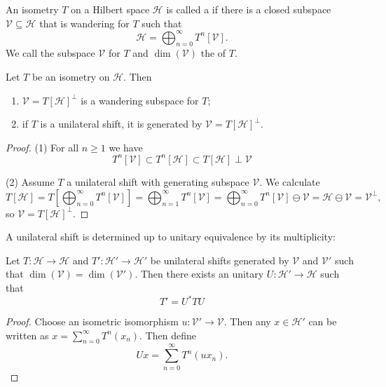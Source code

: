 \begin{definition}
An isometry $T$ on a Hilbert space $\mathcal{H}$ is called a  if there is a closed subspace $\mathcal{V}\subseteq \mathcal{H}$ that is wandering for $T$ such that
\[ \mathcal{H} = \bigoplus_{n=0}^\infty T^n[\mathcal{V}]. \]
We call the subspace $\mathcal{V}$  for $T$ and $\dim(\mathcal{V})$ the  of $T$.
\end{definition}
\begin{lemma} \label{lemma:WoldLemma}
Let $T$ be an isometry on $\mathcal{H}$. Then
\begin{enumerate}
\item $\mathcal{V} = T[\mathcal{H}]^\perp$ is a wandering subspace for $T$;
\item if $T$ is a unilateral shift, it is generated by $\mathcal{V} = T[\mathcal{H}]^\perp$.
\end{enumerate}
\end{lemma}
\begin{proof}
(1) For all $n\geq 1$ we have
\[ T^{n}[\mathcal{V}] \subset T^{n}[\mathcal{H}] \subset T[\mathcal{H}] \perp \mathcal{V} \]

(2) Assume $T$ a unilateral shift with generating subspace $\mathcal{V}$. We calculate
\[ T[\mathcal{H}] = T\left[\bigoplus_{n=0}^\infty T^n[\mathcal{V}]\right] = \bigoplus_{n=1}^\infty T^n[\mathcal{V}] = \bigoplus_{n=0}^\infty T^n[\mathcal{V}] \ominus \mathcal{V} = \mathcal{H}\ominus \mathcal{V} = \mathcal{V}^\perp, \]
so $\mathcal{V} = T[\mathcal{H}]^\perp$.
\end{proof}

A unilateral shift is determined up to unitary equivalence by its multiplicity:
\begin{lemma}
Let $T: \mathcal{H}\to\mathcal{H}$ and $T':\mathcal{H}'\to\mathcal{H}'$ be unilateral shifts generated by $\mathcal{V}$ and $\mathcal{V}'$ such that $\dim(\mathcal{V}) = \dim(\mathcal{V}')$. Then there exists an unitary $U:\mathcal{H}'\to\mathcal{H}$ such that
\[ T' = U^*TU \]
\end{lemma}
\begin{proof}
Choose an isometric isomorphism $u:\mathcal{V}'\to\mathcal{V}$. Then any $x\in\mathcal{H}'$ can be written as $x = \sum_{n=0}^\infty T^n(x_n)$. Then define
\[ Ux = \sum_{n=0}^\infty T^n(ux_n). \]
\end{proof}

